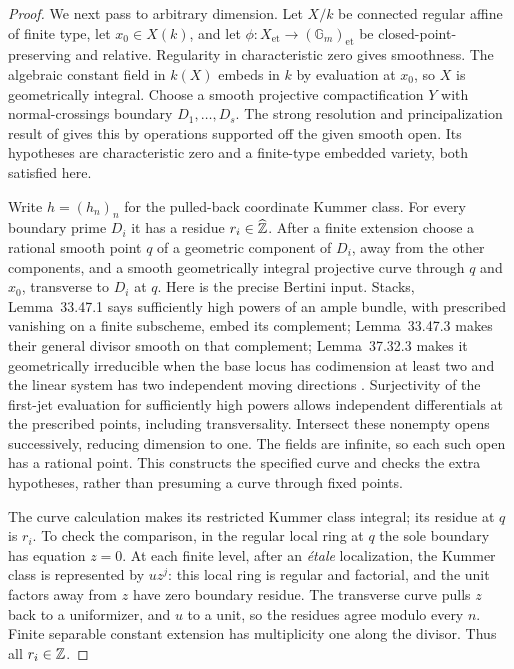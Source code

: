 \begin{proof}
We next pass to arbitrary dimension. Let $X/k$ be connected regular
affine of finite type, let $x_0\in X(k)$, and let
$\phi:X_{\mathrm{et}}\to(\mathbb G_m)_{\mathrm{et}}$ be
closed-point-preserving and relative. Regularity in characteristic
zero gives smoothness. The algebraic constant field in $k(X)$
embeds in $k$ by evaluation at $x_0$, so $X$ is geometrically
integral. Choose a smooth projective compactification $Y$ with
normal-crossings boundary $D_1,\ldots,D_s$. The strong resolution
and principalization result of \citet[pp.~1--4, ``The result''
and ``Idea of proof'']{F_EH2002} gives this by operations supported
off the given smooth open. Its hypotheses are characteristic zero
and a finite-type embedded variety, both satisfied here.

Write $h=(h_n)_n$ for the pulled-back coordinate Kummer class.
For every boundary prime $D_i$ it has a residue
$r_i\in\widehat{\mathbb Z}$. After a finite extension choose a rational
smooth point $q$ of a geometric component of $D_i$, away from
the other components, and a smooth geometrically integral projective
curve through $q$ and $x_0$, transverse to $D_i$ at $q$. Here is the
precise Bertini input. Stacks, Lemma~33.47.1 says sufficiently high
powers of an ample bundle, with prescribed vanishing on a finite
subscheme, embed its complement; Lemma~33.47.3 makes their general
divisor smooth on that complement; Lemma~37.32.3 makes it
geometrically irreducible when the base locus has codimension at
least two and the linear system has two independent moving
directions \citep{F_StacksBertini}. Surjectivity of the first-jet
evaluation for sufficiently high powers allows independent
differentials at the prescribed points, including transversality.
Intersect these nonempty opens successively, reducing dimension
to one. The fields are infinite, so each such open has a rational
point. This constructs the specified curve and checks the extra
hypotheses, rather than presuming a curve through fixed points.

The curve calculation makes its restricted Kummer class integral;
its residue at $q$ is $r_i$. To check the comparison, in the regular
local ring at $q$ the sole boundary has equation $z=0$.
At each finite level, after an \emph{\'etale} localization, the
Kummer class is represented by $u z^j$: this local ring is regular
and factorial, and the unit factors away from $z$ have zero
boundary residue. The transverse curve pulls $z$
back to a uniformizer, and $u$ to a unit, so the residues agree
modulo every $n$. Finite separable constant extension has
multiplicity one along the divisor. Thus all $r_i\in\mathbb Z$.


\end{proof}
